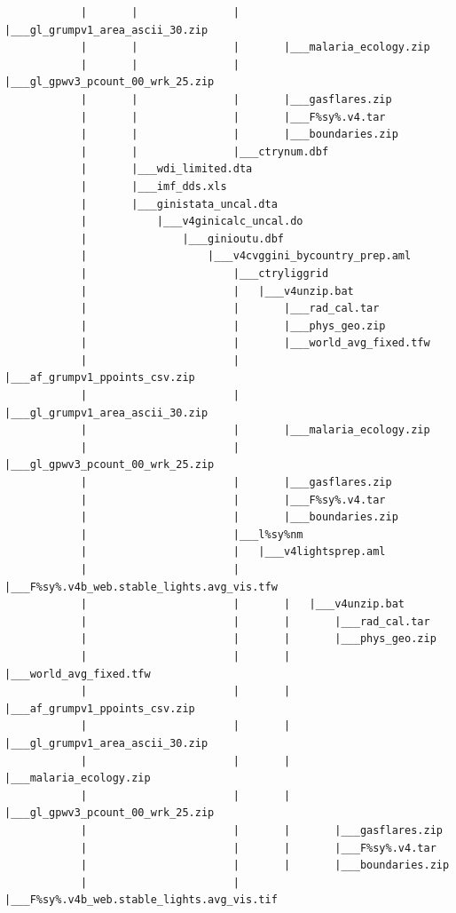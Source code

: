 \documentclass[]{book}
\begin{document}
\begin{verbatim}
            |       |               |       |___gl_grumpv1_area_ascii_30.zip
            |       |               |       |___malaria_ecology.zip
            |       |               |       |___gl_gpwv3_pcount_00_wrk_25.zip
            |       |               |       |___gasflares.zip
            |       |               |       |___F%sy%.v4.tar
            |       |               |       |___boundaries.zip
            |       |               |___ctrynum.dbf
            |       |___wdi_limited.dta
            |       |___imf_dds.xls
            |       |___ginistata_uncal.dta
            |           |___v4ginicalc_uncal.do
            |               |___ginioutu.dbf
            |                   |___v4cvggini_bycountry_prep.aml
            |                       |___ctryliggrid
            |                       |   |___v4unzip.bat
            |                       |       |___rad_cal.tar
            |                       |       |___phys_geo.zip
            |                       |       |___world_avg_fixed.tfw
            |                       |       |___af_grumpv1_ppoints_csv.zip
            |                       |       |___gl_grumpv1_area_ascii_30.zip
            |                       |       |___malaria_ecology.zip
            |                       |       |___gl_gpwv3_pcount_00_wrk_25.zip
            |                       |       |___gasflares.zip
            |                       |       |___F%sy%.v4.tar
            |                       |       |___boundaries.zip
            |                       |___l%sy%nm
            |                       |   |___v4lightsprep.aml
            |                       |       |___F%sy%.v4b_web.stable_lights.avg_vis.tfw
            |                       |       |   |___v4unzip.bat
            |                       |       |       |___rad_cal.tar
            |                       |       |       |___phys_geo.zip
            |                       |       |       |___world_avg_fixed.tfw
            |                       |       |       |___af_grumpv1_ppoints_csv.zip
            |                       |       |       |___gl_grumpv1_area_ascii_30.zip
            |                       |       |       |___malaria_ecology.zip
            |                       |       |       |___gl_gpwv3_pcount_00_wrk_25.zip
            |                       |       |       |___gasflares.zip
            |                       |       |       |___F%sy%.v4.tar
            |                       |       |       |___boundaries.zip
            |                       |       |___F%sy%.v4b_web.stable_lights.avg_vis.tif

\end{verbatim}
\end{document}
